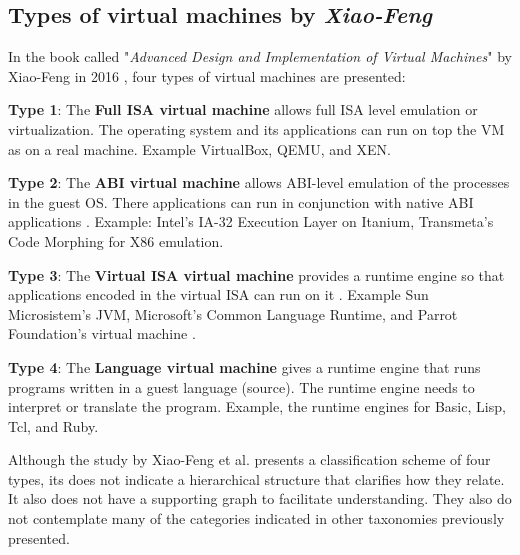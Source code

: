 	\subsection{Types of virtual machines by \textit{Xiao-Feng}}
	
	In the book called "\textit{Advanced Design and Implementation of Virtual Machines}" by Xiao-Feng in 2016 \cite{Xiao-Feng2016}, four types of virtual machines are presented:
	
	\textbf{Type 1}: The \textbf{Full ISA virtual machine} allows full ISA level emulation or virtualization. The operating system and its applications can run on top the VM as on a real machine\cite{Xiao-Feng2016}. Example VirtualBox, QEMU, and XEN.
	
	\textbf{Type 2}: The \textbf{ABI virtual machine} allows ABI-level emulation of the processes in the guest OS. There applications can run in conjunction with native ABI applications \cite{Xiao-Feng2016}. Example: Intel's IA-32 Execution Layer on Itanium, Transmeta's Code Morphing for X86 emulation.
	
	\textbf{Type 3}: The \textbf{Virtual ISA virtual machine} provides a runtime engine so that applications encoded in the virtual ISA can run on it \cite{Xiao-Feng2016}. Example Sun Microsistem's JVM, Microsoft's Common Language Runtime, and Parrot Foundation's virtual machine \cite{Parrot}.
	
	\textbf{Type 4}: The \textbf{Language virtual machine} gives a runtime engine that runs programs written in a guest language (source). The runtime engine needs to interpret or translate the program. Example, the runtime engines for Basic, Lisp, Tcl, and Ruby.
	
	Although the study by Xiao-Feng et al. presents a classification scheme of four types, its does not indicate a hierarchical structure that clarifies how they relate. It also does not have a supporting graph to facilitate understanding. They also do not contemplate many of the categories indicated in other taxonomies previously presented.
	
	
